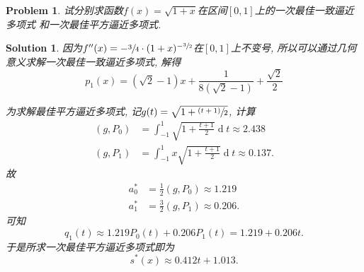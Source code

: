 \documentclass[a4paper, 12pt]{ctexart}
\title{\TITLE}
\author{\AUTHOR}
\date{\today}
\theoremstyle{plain}
\newtheorem{problem}{Problem}[section]
\theoremstyle{plain}
\theoremstyle{plain}
\theoremstyle{nonumberplain}
\newtheorem{solution}{Solution}
\DeclareMathOperator*{\diff}{d}
\begin{document}

    \maketitle
    \thispagestyle{empty}





    \newpage
    \pagestyle{fancy}
    \linenumbers

    \begin{problem}
        试分别求函数$f(x)=\sqrt{1+x}$在区间$[0,1]$上的一次最佳一致逼近多项式
        和一次最佳平方逼近多项式.
    \end{problem}

    \begin{solution}
        因为$f''(x)=-\sfrac{3}{4}\cdot(1+x)^{-\sfrac{3}{2}}$在$[0, 1]$上不变号,
        所以可以通过几何意义求解一次最佳一致逼近多项式, 解得
        \begin{equation}
            p_{1}(x) = (\sqrt{2}-1)x+\frac{1}{8(\sqrt{2}-1)}+\frac{\sqrt{2}}{2}
        \end{equation}

        为求解最佳平方逼近多项式, 记$g(t)=\sqrt{1+\sfrac{(t+1)}{2}}$, 计算
        \begin{equation}
        \begin{aligned}
            (g, P_{0}) &= \int_{-1}^{1}{\sqrt{1+\frac{t+1}{2}}}\diff t
            \approx 2.438\\
            (g, P_{1}) &= \int_{-1}^{1}{x\sqrt{1+\frac{t+1}{2}}}\diff t
            \approx 0.137.
        \end{aligned}
        \end{equation}
        故
        \begin{equation}
        \begin{aligned}
            a_{0}^{*} &= \frac{1}{2}(g, P_{0}) \approx 1.219\\
            a_{1}^{*} &= \frac{3}{2}(g, P_{1}) \approx 0.206.
        \end{aligned}
        \end{equation}
        可知
        \begin{equation}
            q_{1}(t) \approx 1.219P_{0}(t) + 0.206P_{1}(t) = 1.219 + 0.206t.
        \end{equation}
        于是所求一次最佳平方逼近多项式即为
        \begin{equation}
            s^{*}(x) \approx 0.412t + 1.013.
        \end{equation}
    \end{solution}
\end{document}
